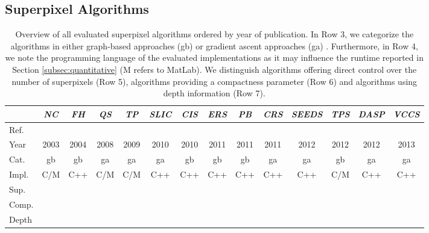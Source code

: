 \documentclass[runningheads]{llncs}
\newcommand{\cmark}{\ding{51}}%
\newcommand{\xmark}{\ding{55}}%
\begin{document}
    \vspace{-1mm}
    \subsection{Superpixel Algorithms}
    \vspace{-0.5mm}
    \label{sec:survey}
    
    \begin{table}[t]
        \caption{Overview of all evaluated superpixel algorithms ordered by year of publication. In Row 3, we categorize the algorithms in either graph-based approaches (gb) or gradient ascent approaches (ga) \cite{AchantaShajiSmithLucchiFuaSuesstrunk:2012}. Furthermore, in Row 4, we note the programming language of the evaluated implementations as it may influence the runtime reported in Section \ref{subsec:quantitative} (M refers to MatLab). We distinguish algorithms offering direct control over the number of superpixels (Row 5), algorithms providing a compactness parameter (Row 6) and algorithms using depth information (Row 7).}
        \label{table:survey}
        \centering
        {\scriptsize
        \begin{tabular}{| l | c | c | c | c | c | c | c | c | c | c | c | c | c |}
        \hline
            & \textit{NC} & \textit{FH} & \textit{QS} & \textit{TP} & \textit{SLIC} & \textit{CIS} & \textit{ERS} & \textit{PB} & \textit{CRS} & \textit{SEEDS} & \textit{TPS} & \textit{DASP} & \textit{VCCS}\\\hline\hline
            Ref. & \cite{RenMalik:2003} & \cite{FelzenswalbHuttenlocher:2004} & \cite{VedaldiSoatto:2008} & \cite{LevinshteinStereKutulakosFleetDickinsonSiddiqi:2009} & \cite{AchantaShajiSmithLucchiFuaSuesstrunk:2010} & \cite{VekslerBoykovMehrani:2010} & \cite{LiuTuzelRamalingamChellappa:2011} & \cite{ZhangHartleyMashfordBurn:2011} & \cite{MesterConradGuevara:2011} & \cite{VanDenBerghBoixRoigCapitaniVanGool:2012} & \cite{DaiTangHuazhaFuXiaochunCao:2012} & \cite{WeikersdorferGossowBeetz:2012} & \cite{PaponAbramovSchoelerWoergoetter:2013}\\
            Year & 2003 & 2004 & 2008 & 2009 & 2010 & 2010 & 2011 & 2011 & 2011 & 2012 & 2012 & 2012 & 2013\\
            Cat. & gb & gb & ga & ga & ga & gb & gb & gb & ga & ga & gb & ga & ga\\
            Impl. & C/M & C++ & C/M & C/M & C++ & C++ & C++ & C++ & C++ & C++ & C/M & C++ & C++\\
            Sup. & \cmark & \xmark & \xmark & \cmark & \cmark & \cmark & \cmark & \cmark & \cmark & \cmark & \cmark & \cmark & \xmark\\
            Comp. & \xmark & \xmark & \xmark & \xmark & \cmark & \xmark & \xmark & \xmark & \cmark & \xmark & \xmark & \cmark & \cmark\\
            Depth & \xmark & \xmark & \xmark & \xmark & \xmark & \xmark & \xmark & \xmark & \xmark & \xmark & \xmark & \cmark & \cmark\\\hline
        \end{tabular}
        }
    \end{table}
    
\end{document}
